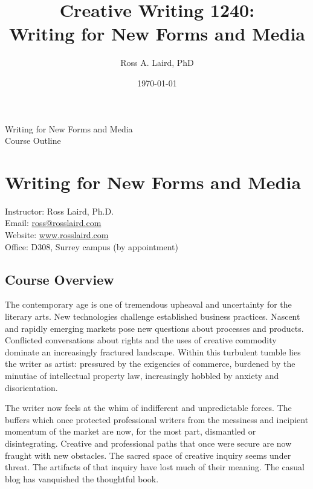 \documentclass[letterpaper,10pt,headsepline]{scrreprt}
\author{Ross A. Laird, PhD}
\title{Creative Writing 1240:\\Writing for New Forms and Media}
\date{\today}
\begin{document}
\pagestyle{empty}
\vspace*{7em} 
\begin{center}
\huge{Writing for New Forms and Media}\\
\vspace*{1em} 
\large{Course Outline}
\end{center}
\clearpage
\pagestyle{scrheadings}
\tableofcontents
\chapter{Writing for New Forms and Media}
Instructor: Ross Laird, Ph.D.\\ 
Email: \url{ross@rosslaird.com}\\
Website: \url{www.rosslaird.com}\\
Office: D308, Surrey campus (by appointment)\\

\section{Course Overview}

The contemporary age is one of tremendous upheaval and uncertainty for the literary arts. New technologies challenge established business practices. Nascent and rapidly emerging markets pose new questions about processes and products. Conflicted conversations about rights and the uses of creative commodity dominate an increasingly fractured landscape. Within this turbulent tumble lies the writer as artist: pressured by the exigencies of commerce, burdened by the minutiae of intellectual property law, increasingly hobbled by anxiety and disorientation.

The writer now feels at the whim of indifferent and unpredictable forces. The buffers which once protected professional writers from the messiness and incipient momentum of the market are now, for the most part, dismantled or disintegrating. Creative and professional paths that once were secure are now fraught with new obstacles. The sacred space of creative inquiry seems under threat. The artifacts of that inquiry have lost much of their meaning. The casual blog has vanquished the thoughtful book.
\end{document}
